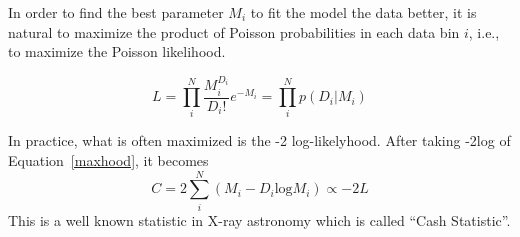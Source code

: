 In order to find the best parameter $M_i$ to fit the model the data better, it is natural to maximize the product of Poisson probabilities in each data bin $i$, i.e., to maximize the Poisson likelihood.

\begin{equation}
    L = \prod_i^{N} \dfrac{M_i^{D_i}}{D_i!}e^{-M_i} =\prod_i^{N} p(D_i|M_i)
    \label{maxhood}
\end{equation}

In practice, what is often maximized is the -2 log-likelyhood. After taking -2log of Equation~\ref{maxhood}, it becomes 
\begin{equation}
    C = 2\sum_i^{N} (M_i - D_i\mathrm{log}M_i) \propto -2L
    \label{cash}
\end{equation}
This is a well known statistic in X-ray astronomy which is called ``Cash Statistic''.\par 
 
 
 
 
 
 
 
 
 
 
 
 
 
 
 
 
 
 
 







 








%